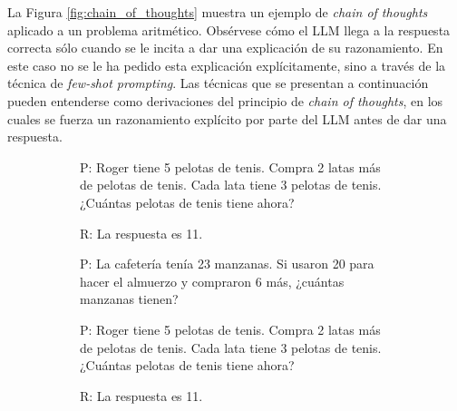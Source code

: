 La Figura \ref{fig:chain_of_thoughts} muestra un ejemplo de \textit{chain of thoughts} aplicado a un problema aritmético. Obsérvese cómo el LLM llega a la respuesta correcta sólo cuando se le incita a dar una explicación de su razonamiento. En este caso no se le ha pedido esta explicación explícitamente, sino a través de la técnica de \textit{few-shot prompting}. Las técnicas que se presentan a continuación pueden entenderse como derivaciones del principio de \textit{chain of thoughts}, en los cuales se fuerza un razonamiento explícito por parte del LLM antes de dar una respuesta.

\begin{figure}[H]
    \caption[Chain of thoughts]{\textit{Chain of thoughts}. En ambos ejemplos se plantea un problema aritmético a GPT-3. En (a), por medio de \textit{few-shot prompting}, se le pide una respuesta directa al problema. En (b), aplicando, además, la técnica de \textit{chain of thoughts}, se le pide que explique su razonamiento, lo cual lleva a una respuesta correcta. Se ha resaltado el texto correspondiente a los razonamientos.}
    \centering
    \begin{subfigure}{.48\textwidth}
      \centering
      \begin{mdframed}
        P: Roger tiene 5 pelotas de tenis. Compra 2 latas más de pelotas de tenis. Cada lata tiene 3 pelotas de tenis. ¿Cuántas pelotas de tenis tiene ahora?
        \vspace{0.2cm}

        R: La respuesta es 11.
        \vspace{0.2cm}

        P: La cafetería tenía 23 manzanas. Si usaron 20 para hacer el almuerzo y compraron 6 más, ¿cuántas manzanas tienen?
        \vspace{0.2cm}
      \end{mdframed}
    \end{subfigure}\hfill
    \begin{subfigure}{.48\textwidth}
      \centering
      \begin{mdframed}
        P: Roger tiene 5 pelotas de tenis. Compra 2 latas más de pelotas de tenis. Cada lata tiene 3 pelotas de tenis. ¿Cuántas pelotas de tenis tiene ahora?
        \vspace{0.2cm}

        R:  La respuesta es 11.
        \vspace{0.2cm}


\end{mdframed}
\end{subfigure}
\end{figure}
